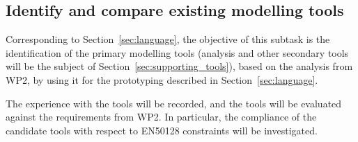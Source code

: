 \documentclass{template/openetcs_article}
\begin{document}

\subsection{Identify and compare existing modelling tools}
\label{sec:tool}

Corresponding to Section~\ref{sec:language}, the objective of this
subtask is the identification of the primary modelling tools 
(analysis and other secondary tools will be the subject of 
Section~\ref{sec:supporting_tools}), 
based on the
analysis from WP2, by using it for the prototyping described in
Section~\ref{sec:language}. 

The experience with the tools will be recorded, and the tools will be
evaluated against the requirements from WP2. In particular, the compliance of
the candidate tools with respect to EN50128 constraints will be investigated.
\end{document}
